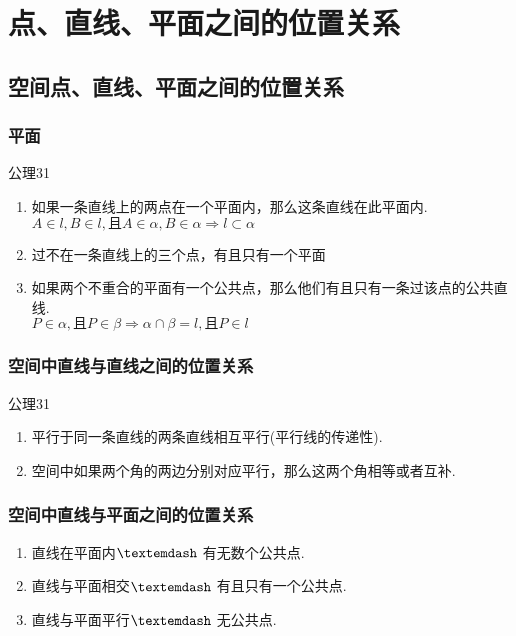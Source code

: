 \chapter{点、直线、平面之间的位置关系}
\section{空间点、直线、平面之间的位置关系}
\subsection{平面}
\begin{theorem}{公理}{31}
	\begin{enumerate}[noitemsep]
	\item 如果一条直线上的两点在一个平面内，那么这条直线在此平面内.\\
	$A\in l,B\in l,且A\in \alpha ,B\in \alpha  \Rightarrow l\subset \alpha $
	\item 过不在一条直线上的三个点，有且只有一个平面
	\item 如果两个不重合的平面有一个公共点，那么他们有且只有一条过该点的公共直线.\\
	$P\in \alpha ,且 P\in \beta \Rightarrow \alpha \cap \beta =l ,且 P\in l  $
\end{enumerate}
\end{theorem}
\subsection{空间中直线与直线之间的位置关系}

\begin{theorem}{公理}{31}
\begin{enumerate}[noitemsep]
	\item  平行于同一条直线的两条直线相互平行(平行线的传递性).
	\item 空间中如果两个角的两边分别对应平行，那么这两个角相等或者互补.
\end{enumerate}
\end{theorem}
\subsection{空间中直线与平面之间的位置关系}
\begin{enumerate}
\item	直线在平面内$\textemdash$ 有无数个公共点.
\item     直线与平面相交$\textemdash $ 有且只有一个公共点.
\item    直线与平面平行$\textemdash $  无公共点.
\end{enumerate}
